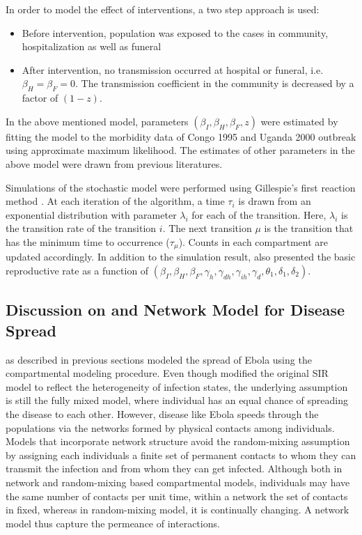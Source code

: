 \documentclass[12pt, journal,onecolumn]{IEEEtran}
\begin{document}
In order to model the effect of interventions, a two step approach is used:

\begin{itemize}
\item Before intervention, population was exposed to the cases in community, hospitalization as well as funeral
\item After intervention, no transmission occurred at hospital or funeral, i.e. $\beta_H = \beta_F = 0$. The transmission coefficient in the community is decreased by a factor of $(1-z)$.
\end{itemize}

In the above mentioned model, parameters $(\beta_I, \beta_H, \beta_F , z)$ were estimated by fitting the model to the morbidity data of Congo 1995 and Uganda 2000 outbreak using approximate maximum likelihood. The estimates of other parameters in the above model were drawn from previous literatures.

Simulations of the stochastic model were performed using Gillespie's first reaction method \citep{gillespie1976general}. At each iteration of the algorithm, a time $\tau_i$ is drawn from an exponential distribution with parameter $\lambda_i$ for each of the transition. Here, $\lambda_i$ is the transition rate of the transition $i$. The next transition $\mu$ is the transition that has the minimum time to occurrence ($\tau_\mu$). Counts in each compartment are updated accordingly. In addition to the simulation result,  \citep{legrand2007understanding} also presented the basic reproductive rate as a function of $(\beta_I,\beta_H,\beta_F,\gamma_h,\gamma_{dh},\gamma_{ih},\gamma_d,\theta_1,\delta_1,\delta_2)$.


\subsection{\textbf{Discussion on \citep{chowell2004basic, legrand2007understanding} and Network Model for Disease Spread \citep{newman2002spread}}}
\citep{chowell2004basic, legrand2007understanding} as described in previous sections modeled the spread of Ebola using the compartmental modeling procedure. Even though \citep{legrand2007understanding} modified the original SIR model to reflect the heterogeneity of infection states, the underlying assumption is still the fully mixed model, where individual has an equal chance of spreading the disease to each other. However, disease like Ebola speeds through the populations via the networks formed by physical contacts among individuals. Models that incorporate network structure avoid the random-mixing assumption by assigning each individuals a finite set of permanent contacts to whom they can transmit the infection and from whom they can get infected. Although both in network and random-mixing based compartmental models, individuals may have the same number of contacts per unit time, within a network the set of contacts in fixed, whereas in random-mixing model, it is continually changing. A network model thus capture the permeance of interactions.
\end{document}
